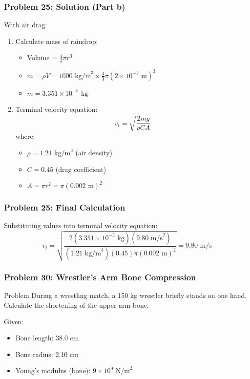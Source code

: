 \documentclass{beamer}
\begin{document}
\begin{frame}
\frametitle{Problem 25: Solution (Part b)}
With air drag:
\begin{enumerate}
\item Calculate mass of raindrop:
    \begin{itemize}
    \item Volume = $\frac{4}{3}\pi r^3$
    \item $m = \rho V = 1000 \text{ kg/m}^3 \times \frac{4}{3}\pi(2 \times 10^{-3} \text{ m})^3$
    \item $m = 3.351 \times 10^{-5} \text{ kg}$
    \end{itemize}
\item Terminal velocity equation:
    \[v_t = \sqrt{\frac{2mg}{\rho CA}}\]
    where:
    \begin{itemize}
    \item $\rho = 1.21 \text{ kg/m}^3$ (air density)
    \item $C = 0.45$ (drag coefficient)
    \item $A = \pi r^2 = \pi(0.002 \text{ m})^2$
    \end{itemize}
\end{enumerate}
\end{frame}

\begin{frame}
\frametitle{Problem 25: Final Calculation}
Substituting values into terminal velocity equation:
\[v_t = \sqrt{\frac{2(3.351 \times 10^{-5} \text{ kg})(9.80 \text{ m/s}^2)}{(1.21 \text{ kg/m}^3)(0.45)\pi(0.002 \text{ m})^2}} = 9.80 \text{ m/s}\]
\end{frame}

\begin{frame}
\frametitle{Problem 30: Wrestler's Arm Bone Compression}
\begin{block}{Problem}
During a wrestling match, a 150 kg wrestler briefly stands on one hand. Calculate the shortening of the upper arm bone.
\end{block}
Given:
\begin{itemize}
\item Bone length: 38.0 cm
\item Bone radius: 2.10 cm
\item Young's modulus (bone): $9 \times 10^9 \text{ N/m}^2$
\end{itemize}
\end{frame}
\end{document}

